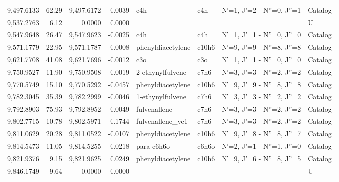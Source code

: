 \begin{longtable}{rrrrllll}
 9,497.6133 &     62.29 &        9,497.6172 &    0.0039 &                         c4h &     c4h &            N'=1, J'=2 - N''=0, J''=1 &    Catalog \\
 9,537.2763 &      6.12 &            0.0000 &    0.0000 &                             &         &                                      &          U \\
 9,547.9648 &     26.47 &        9,547.9623 &   -0.0025 &                         c4h &     c4h &            N'=1, J'=1 - N''=0, J''=0 &    Catalog \\
 9,571.1779 &     22.95 &        9,571.1787 &    0.0008 &           phenyldiacetylene &   c10h6 &            N'=9, J'=9 - N''=8, J''=8 &    Catalog \\
 9,621.7708 &     41.08 &        9,621.7696 &   -0.0012 &                         c3o &     c3o &            N'=1, J'=1 - N''=0, J''=0 &    Catalog \\
 9,750.9527 &     11.90 &        9,750.9508 &   -0.0019 &            2-ethynylfulvene &    c7h6 &            N'=3, J'=3 - N''=2, J''=2 &    Catalog \\
 9,770.5749 &     15.10 &        9,770.5292 &   -0.0457 &           phenyldiacetylene &   c10h6 &            N'=9, J'=9 - N''=8, J''=8 &    Catalog \\
 9,782.3045 &     35.39 &        9,782.2999 &   -0.0046 &            1-ethynylfulvene &    c7h6 &            N'=3, J'=3 - N''=2, J''=2 &    Catalog \\
 9,792.8903 &     75.93 &        9,792.8952 &    0.0049 &                fulvenallene &    c7h6 &            N'=3, J'=3 - N''=2, J''=2 &    Catalog \\
 9,802.7715 &     10.78 &        9,802.5971 &   -0.1744 &            fulvenallene_ve1 &    c7h6 &            N'=3, J'=3 - N''=2, J''=2 &    Catalog \\
 9,811.0629 &     20.28 &        9,811.0522 &   -0.0107 &           phenyldiacetylene &   c10h6 &            N'=9, J'=8 - N''=8, J''=7 &    Catalog \\
 9,814.5473 &     11.05 &        9,814.5255 &   -0.0218 &                  para-c6h6o &   c6h6o &            N'=2, J'=1 - N''=1, J''=0 &    Catalog \\
 9,821.9376 &      9.15 &        9,821.9625 &    0.0249 &           phenyldiacetylene &   c10h6 &            N'=9, J'=6 - N''=8, J''=5 &    Catalog \\
 9,846.1749 &      9.64 &            0.0000 &    0.0000 &                             &         &                                      &          U \\

\end{longtable}
